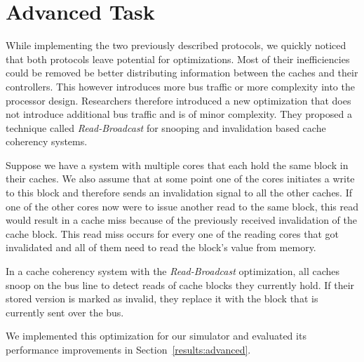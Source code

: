 \section{Advanced Task}\label{sec:advanced_task}
While implementing the two previously described protocols, we quickly noticed that both protocols
leave potential for optimizations. Most of their inefficiencies could be removed be better
distributing information between the caches and their controllers. This however introduces more bus
traffic or more complexity into the processor design. Researchers \cite{read_broadcast_prop1,
    read_broadcast_prop2, read_broadcast_prop3} therefore introduced a new
optimization that does not introduce additional bus traffic and is of minor complexity. They
proposed a technique called \emph{Read-Broadcast}\cite{read_broadcast_analysis} for snooping and
invalidation based cache coherency systems.

Suppose we have a system with multiple cores that each hold the same block in their caches. We also
assume that at some point one of the cores initiates a write to this block and therefore sends an
invalidation signal to all the other caches. If one of the other cores now were to issue another
read to the same block, this read would result in a cache miss because of the previously received
invalidation of the cache block. This read miss occurs for every one of the reading cores that got
invalidated and all of them need to read the block's value from memory.

In a cache coherency system with the \emph{Read-Broadcast} optimization, all caches snoop on the bus
line to detect reads of cache blocks they currently hold. If their stored version is marked as
invalid, they replace it with the block that is currently sent over the bus.

We implemented this optimization for our simulator and evaluated its performance improvements in
Section~\ref{results:advanced}.

